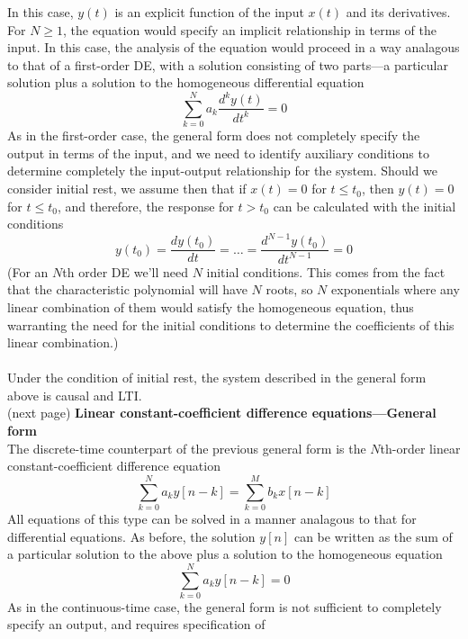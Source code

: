 \documentclass{report}
\begin{document}
In this case, $y(t)$ is an explicit function of the input $x(t)$ and its derivatives. 
For $N\geq1$, the equation would specify an implicit relationship in terms of the input. In this case, the analysis of the equation would 
proceed in a way analagous to that of a first-order DE, with a solution consisting of two parts---a particular solution plus a solution to
the homogeneous differential equation
\begin{equation*}
\sum^N_{k=0}a_k\frac{d^ky(t)}{dt^k}=0
\end{equation*}
As in the first-order case, the general form does not completely specify the output in terms of the input, and we need to identify 
auxiliary conditions to determine completely the input-output relationship for the system. Should we consider initial rest, we assume then
that if $x(t)=0$ for $t\leq t_0$, then $y(t)=0$ for $t\leq t_0$, and therefore, the response for $t>t_0$ can be calculated with the 
initial conditions
\begin{equation*}
y(t_0)=\frac{dy(t_0)}{dt}=\ldots=\frac{d^{N-1}y(t_0)}{dt^{N-1}}=0
\end{equation*}
(For an $N$th order DE we'll need $N$ initial conditions. This comes from the fact that the characteristic polynomial will have $N$ roots,
so $N$ exponentials where any linear combination of them would satisfy the homogeneous equation, thus warranting the need for the initial conditions
to determine the coefficients of this linear combination.)\\
\vspace{1mm}\\
Under the condition of initial rest, the system described in the general form above is causal and LTI.\\
(next page)\newpage
\noindent\textbf{Linear constant-coefficient difference equations---General form}\\
The discrete-time counterpart of the previous general form is the $N$th-order linear constant-coefficient difference equation
\begin{equation*}
\sum^N_{k=0}a_ky[n-k]=\sum^M_{k=0}b_kx[n-k]
\end{equation*}
All equations of this type can be solved in a manner analagous to that for differential equations. As before, the solution 
$y[n]$ can be written as the sum of a particular solution to the above plus a solution to the homogeneous equation
\begin{equation*}
\sum^N_{k=0}a_ky[n-k]=0
\end{equation*}
As in the continuous-time case, the general form is not sufficient to completely specify an output, and requires specification of
\end{document}

